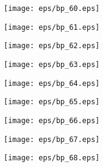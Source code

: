 \documentclass{book}
\begin{document}
	\clearpage\begin{figure}[p]
    \centering
	\texttt{[image: eps/bp\_60.eps]}
	\end{figure}
	\clearpage\begin{figure}[p]
    \centering
	\texttt{[image: eps/bp\_61.eps]}
	\end{figure}
	\clearpage\begin{figure}[p]
    \centering
	\texttt{[image: eps/bp\_62.eps]}
	\end{figure}
	\clearpage\begin{figure}[p]
    \centering
	\texttt{[image: eps/bp\_63.eps]}
	\end{figure}
	\clearpage\begin{figure}[p]
    \centering
	\texttt{[image: eps/bp\_64.eps]}
	\end{figure}
	\clearpage\begin{figure}[p]
    \centering
	\texttt{[image: eps/bp\_65.eps]}
	\end{figure}
	\clearpage\begin{figure}[p]
    \centering
	\texttt{[image: eps/bp\_66.eps]}
	\end{figure}
	\clearpage\begin{figure}[p]
    \centering
	\texttt{[image: eps/bp\_67.eps]}
	\end{figure}
	\clearpage\begin{figure}[p]
    \centering
	\texttt{[image: eps/bp\_68.eps]}
	\end{figure}
	\clearpage
\end{document}
